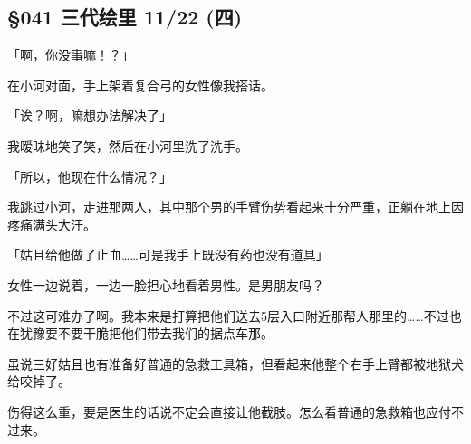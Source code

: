 \subsection{§041 三代绘里 11/22 (四)}

「啊，你没事嘛！？」

在小河对面，手上架着复合弓的女性像我搭话。

「诶？啊，嘛想办法解决了」

我暧昧地笑了笑，然后在小河里洗了洗手。

「所以，他现在什么情况？」

我跳过小河，走进那两人，其中那个男的手臂伤势看起来十分严重，正躺在地上因疼痛满头大汗。

「姑且给他做了止血……可是我手上既没有药也没有道具」

女性一边说着，一边一脸担心地看着男性。是男朋友吗？

不过这可难办了啊。我本来是打算把他们送去5层入口附近那帮人那里的……不过也在犹豫要不要干脆把他们带去我们的据点车那。

虽说三好姑且也有准备好普通的急救工具箱，但看起来他整个右手上臂都被地狱犬给咬掉了。

伤得这么重，要是医生的话说不定会直接让他截肢。怎么看普通的急救箱也应付不过来。

